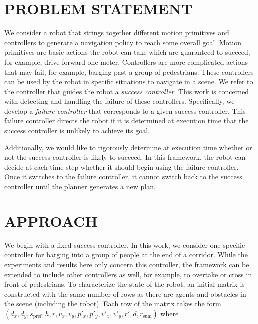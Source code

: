 \documentclass[letterpaper, 10 pt, conference]{ieeeconf}  %
\begin{document}
\section{PROBLEM STATEMENT}\label{sec:problemstatement}
	We consider a robot that strings together different motion primitives and controllers to generate a navigation policy to reach some overall goal. Motion primitives are basic actions the robot can take which are guaranteed to succeed, for example, drive forward one meter. Controllers are more complicated actions that may fail, for example, barging past a group of pedestrians. These controllers can be used by the robot in specific situations to navigate in a scene. We refer to the controller that guides the robot a \textit{success controller}. This work is concerned with detecting and handling the failure of these controllers. Specifically, we develop a \textit{failure controller} that corresponds to a given success controller. This failure controller directs the robot if it is determined at execution time that the success controller is unlikely to achieve its goal. 
	
	Additionally, we would like to rigorously determine at execution time whether or not the success controller is likely to succeed. In this framework, the robot can decide at each time step whether it should begin using the failure controller. Once it switches to the failure controller, it cannot switch back to the success controller until the planner generates a new plan. 
		
\section{APPROACH}\label{sec:approach}
	We begin with a fixed success controller. In this work, we consider one specific controller for barging into a group of people at the end of a corridor. While the experiments and results here only concern this controller, the framework can be extended to include other controllers as well, for example, to overtake or cross in front of pedestrians. To characterize the state of the robot, an initial matrix is constructed with the same number of rows as there are agents and obstacles in the scene (including the robot). Each row of the matrix takes the form $(d_x, d_y, s_\text{pref}, h, r, v_x, v_y, p'_x, p'_y, v'_x, v'_y, r', d, r_\text{sum})$ where 
	
\end{document}
